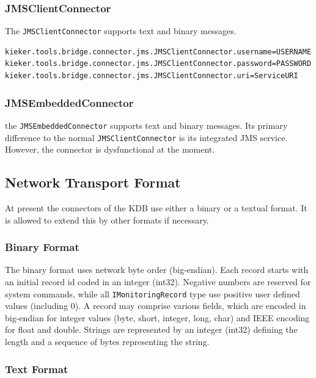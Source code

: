 \documentclass[11pt,a4paper]{article}
\begin{document}
%
\subsubsection{JMSClientConnector}

The \texttt{JMSClientConnector} supports text and binary messages.

\begin{verbatim}
kieker.tools.bridge.connector.jms.JMSClientConnector.username=USERNAME
kieker.tools.bridge.connector.jms.JMSClientConnector.password=PASSWORD
kieker.tools.bridge.connector.jms.JMSClientConnector.uri=ServiceURI
\end{verbatim}

%
\subsubsection{JMSEmbeddedConnector}

the \texttt{JMSEmbeddedConnector} supports text and binary messages. Its primary difference to the normal \texttt{JMSClientConnector} is its integrated JMS service. However, the connector is dysfunctional at the moment.

%
\subsection{Network Transport Format}

At present the connectors of the KDB use either a binary or a textual format. It is allowed to extend this by other formats if necessary.

%
\subsubsection{Binary Format}

The binary format uses network byte order (big-endian). Each record starts with an initial record id coded in an integer (int32). Negative numbers are reserved for system commands, while all \texttt{IMonitoringRecord} type use positive user defined values (including 0). A record may comprise various fields, which are encoded in big-endian for integer values (byte, short, integer, long, char) and IEEE encoding for float and double. Strings are represented by an integer (int32) defining the length and a sequence of bytes representing the string.

%
\subsubsection{Text Format}
\end{document}
